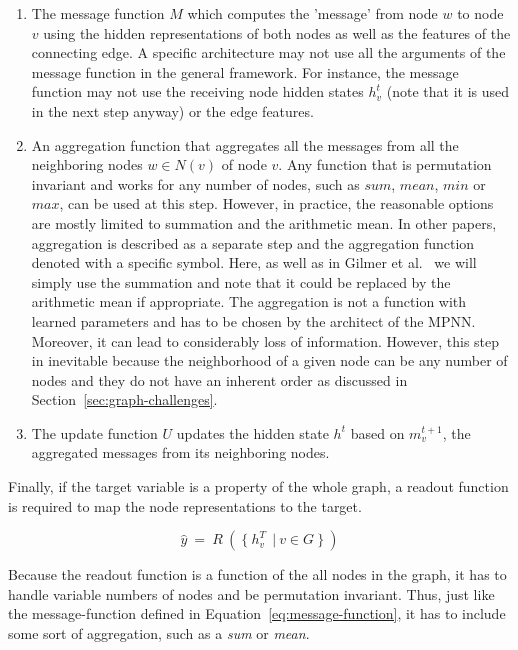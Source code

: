 \begin{enumerate}
	\item The message function $M$ which computes the 'message' from node $w$ to node $v$ using the hidden representations of both nodes as well as the features of the connecting edge. A specific architecture may not use all the arguments of the message function in the general framework. For instance, the message function may not use the receiving node hidden states $h_v^t$ (note that it is used in the next step anyway) or the edge features.
	\item An aggregation function that aggregates all the messages from all the neighboring nodes $w \in N(v)$ of node $v$. Any function that is permutation invariant and works for any number of nodes, such as $sum$, $mean$, $min$ or $max$, can be used at this step. However, in practice, the reasonable options are mostly limited to summation and the arithmetic mean.	
	In other papers, aggregation is described as a separate step and the aggregation function denoted with a specific symbol. Here, as well as in Gilmer et al.~\cite{Gilmer2017} we will simply use the summation and note that it could be replaced by the arithmetic mean if appropriate.
	The aggregation is not a function with learned parameters and has to be chosen by the architect of the MPNN. Moreover, it can lead to considerably loss of information. However, this step in inevitable because the neighborhood of a given node can be any number of nodes and they do not have an inherent order as discussed in Section~\ref{sec:graph-challenges}.
	\item The update function $U$ updates the hidden state $h^t$ based on  $m_v^{t+1}$, the aggregated messages from its neighboring nodes.
\end{enumerate}

Finally, if the target variable is a property of the whole graph, a readout function is required to map the node representations to the target.

\begin{equation}\label{eq:readout-function}
	\hat{y} ~=~ R~(~\{~h_v^T\ ~|~ v \in G~\}~) 
\end{equation}


Because the readout function is a function of the all nodes in the graph, it has to handle variable numbers of nodes and be permutation invariant. Thus, just like the message-function defined in Equation~\ref{eq:message-function}, it has to include some sort of aggregation, such as a \textit{sum} or \textit{mean}.

